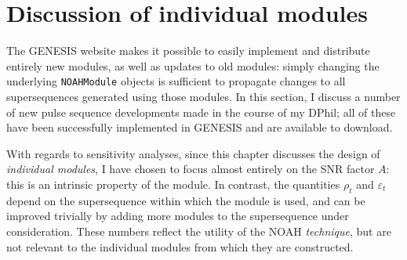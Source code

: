 \section{Discussion of individual modules}
\label{sec:noah__modules}

The GENESIS website makes it possible to easily implement and distribute entirely new modules, as well as updates to old modules: simply changing the underlying \texttt{NOAHModule} objects is sufficient to propagate changes to all supersequences generated using those modules.
In this section, I discuss a number of new pulse sequence developments made in the course of my DPhil; all of these have been successfully implemented in GENESIS and are available to download.

With regards to sensitivity analyses, since this chapter discusses the design of \textit{individual modules}, I have chosen to focus almost entirely on the SNR factor $A$: this is an intrinsic property of the module.
In contrast, the quantities $\rho_t$ and $\varepsilon_t$ depend on the supersequence within which the module is used, and can be improved trivially by adding more modules to the supersequence under consideration.
These numbers reflect the utility of the NOAH \textit{technique}, but are not relevant to the individual modules from which they are constructed.









